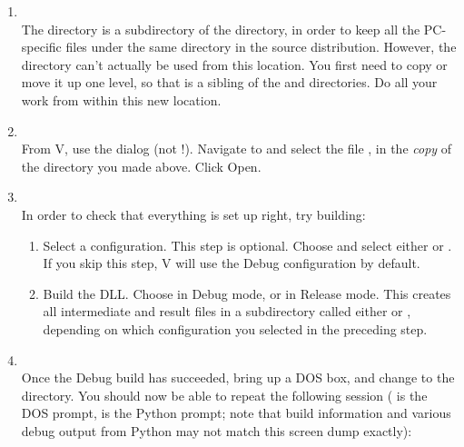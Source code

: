 \begin{enumerate}
  \item
  \\
    The  directory is a subdirectory of the 
    directory, in order to keep all the PC-specific files under the
    same directory in the source distribution.  However, the
     directory can't actually be used from this
    location.  You first need to copy or move it up one level, so that
     is a sibling of the  and 
    directories.  Do all your work from within this new location.

  \item
  \\
    From V\Cpp, use the 
    dialog (not !).  Navigate to and
    select the file , in the \emph{copy} of the
     directory you made above.  Click Open.

  \item
  \\
    In order to check that everything is set up right, try building:

    \begin{enumerate}
      \item
        Select a configuration.  This step is optional.  Choose
         and
        select either  or
        .  If you skip this step,
        V\Cpp{} will use the Debug configuration by default.

      \item
        Build the DLL.  Choose  in Debug mode, or  in Release mode.  This creates all
        intermediate and result files in a subdirectory called either
         or , depending on which
        configuration you selected in the preceding step.
    \end{enumerate}

  \item
  \\
    Once the Debug build has succeeded, bring up a DOS box, and change
    to the  directory.  You
    should now be able to repeat the following session ( is
    the DOS prompt, \code{>\code{>}>} is the Python prompt; note that
    build information and various debug output from Python may not
    match this screen dump exactly):


\end{enumerate}
